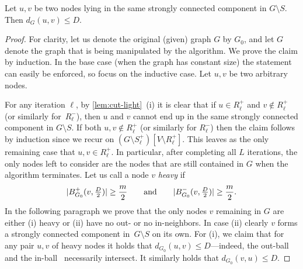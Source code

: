 \documentclass[letterpaper,11pt]{article}
\begin{document}
\begin{lemma} \label{lem:ldd-fast-correctness}
Let $u, v$ be two nodes lying in the same strongly connected component in $G \setminus S$. Then $d_G(u, v) \leq D$.
\end{lemma}
\begin{proof}
For clarity, let us denote the original (given) graph $G$ by $G_0$, and let $G$ denote the graph that is being manipulated by the algorithm. We prove the claim by induction. In the base case (when the graph has constant size) the statement can easily be enforced, so focus on the inductive case. Let $u, v$ be two arbitrary nodes.

For any iteration $\ell$, by \cref{lem:cut-light}~(i) it is clear that if $u \in R^+_\ell$ and $v \not\in R^+_\ell$ (or similarly for~$R^-_\ell$), then $u$ and $v$ cannot end up in the same strongly connected component in $G \setminus S$. If both $u, v \not\in R^+_\ell$ (or similarly for $R^-_\ell$) then the claim follows by induction since we recur on $(G \setminus S^+_\ell)[V \setminus R^+_\ell]$. This leaves as the only remaining case that $u, v \in R^+_\ell$. In particular, after completing all $L$ iterations, the only nodes left to consider are the nodes that are still contained in $G$ when the algorithm terminates. Let us call a node $v$ \emph{heavy} if
\begin{equation*}
    |B^+_{G_0}(v, \tfrac D2)| \geq \frac{m}{2} \qquad\text{and}\qquad |B^-_{G_0}(v, \tfrac D2)| \geq \frac{m}{2}.
\end{equation*}
In the following paragraph we prove that the only nodes $v$ remaining in $G$ are either (i) heavy or (ii) have no out- or no in-neighbors. In case (ii) clearly $v$ forms a strongly connected component in~$G \setminus S$ on its own. For (i), we claim that for any pair $u, v$ of heavy nodes it holds that $d_{G_0}(u, v) \leq D$---indeed, the out-ball~ and the in-ball~ necessarily intersect. It similarly holds that $d_{G_0}(v, u) \leq D$.


\end{proof}
\end{document}
